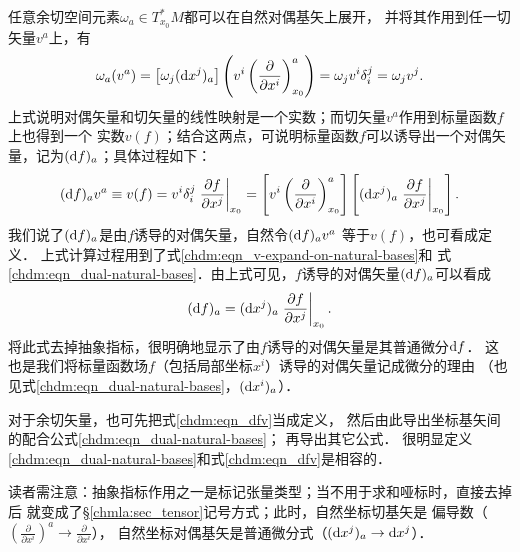 任意余切空间元素$\omega_a \in T_{x_0}^{*}M$都可以在自然对偶基矢上展开，
并将其作用到任一切矢量$v^a$上，有
\begin{equation}
    \omega_a (v^a) = \left[\omega_j({\rm d}x^j)_a\right] 
      \left(v^i \left(\frac{\partial }{\partial x^i}\right)^a_{x_0}\right) = 
     \omega_j v^i \delta^j_i = \omega_j v^j .
\end{equation}
上式说明对偶矢量和切矢量的线性映射是一个实数；而切矢量$v^a$作用到标量函数$f$上也得到一个
实数$v(f)$；结合这两点，可说明标量函数$f$可以诱导出一个对偶矢量，记为$({\rm d}f)_a$；具体过程如下：
\begin{equation}\label{chdm:eqn_dfv}
    ({\rm d}f)_a v^a \equiv v(f)  %
    = v^i  \delta_i^j  \left.\frac{\partial f}{\partial x^j}\right|_{x_0}
    = \left[v^i  \left(\frac{\partial }{\partial x^i}\right)^a_{x_0}\right] \left[
      ({\rm d}x^j)_a  \left.\frac{\partial f}{\partial x^j}\right|_{x_0} \right] .
\end{equation}
我们说了$({\rm d}f)_a$是由$f$诱导的对偶矢量，自然令$({\rm d}f)_a v^a$ 等于$v(f)$，也可看成定义．
上式计算过程用到了式\eqref{chdm:eqn_v-expand-on-natural-bases}和
式\eqref{chdm:eqn_dual-natural-bases}．由上式可见，$f$诱导的对偶矢量$({\rm d}f)_a$可以看成
\begin{equation}\label{chdm:eqn_df}
    ({\rm d}f)_a = ({\rm d}x^j)_a \left.\frac{\partial f}{\partial x^j}\right|_{x_0} .
\end{equation}
将此式去掉抽象指标，很明确地显示了由$f$诱导的对偶矢量是其普通{\heiti 微分}${\rm d}f$．
这也是我们将标量函数场$f$（包括局部坐标$x^i$）诱导的对偶矢量记成微分的理由
（也见式\eqref{chdm:eqn_dual-natural-bases}，$({\rm d}x^i)_a$）．

对于余切矢量，也可先把式\eqref{chdm:eqn_dfv}当成定义，
然后由此导出坐标基矢间的配合公式\eqref{chdm:eqn_dual-natural-bases}；
再导出其它公式．
很明显定义\eqref{chdm:eqn_dual-natural-bases}和式\eqref{chdm:eqn_dfv}是相容的．


\begin{remark}
读者需注意：抽象指标作用之一是标记张量类型；当不用于求和哑标时，直接去掉后
就变成了\S\ref{chmla:sec_tensor}记号方式；此时，自然坐标切基矢是
偏导数（$(\frac{\partial }{\partial x^i})^a\to \frac{\partial }{\partial x^i}$），
自然坐标对偶基矢是普通微分式（$({\rm d}x^j)_a \to {\rm d}x^j$）．
\end{remark}


